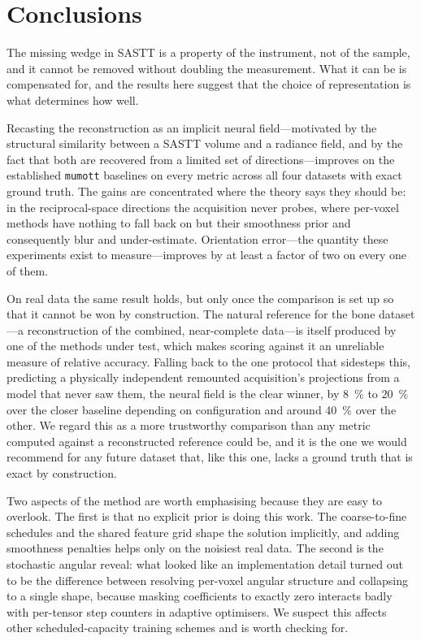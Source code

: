 \documentclass[11pt,a4paper]{article}
\begin{document}
\section{Conclusions}
\label{sec:conclusions}

The missing wedge in SASTT is a property of the instrument, not of the sample, and it
cannot be removed without doubling the measurement. What it can be is compensated for, and
the results here suggest that the choice of representation is what determines how well.

Recasting the reconstruction as an implicit neural field---motivated by the structural
similarity between a SASTT volume and a radiance field, and by the fact that both are
recovered from a limited set of directions---improves on the established \texttt{mumott}
baselines on every metric across all four datasets with exact ground truth. The gains are
concentrated where the theory says they should be: in the reciprocal-space directions the
acquisition never probes, where per-voxel methods have nothing to fall back on but their
smoothness prior and consequently blur and under-estimate. Orientation error---the quantity
these experiments exist to measure---improves by at least a factor of two on every one of
them.

On real data the same result holds, but only once the comparison is set up so that it
cannot be won by construction. The natural reference for the bone dataset---a
reconstruction of the combined, near-complete data---is itself produced by one of the
methods under test, which makes scoring against it an unreliable measure of relative
accuracy. Falling back to the one protocol that sidesteps this, predicting a physically
independent remounted acquisition's projections from a model that never saw them, the
neural field is the clear winner, by \SI{8}{\percent} to \SI{20}{\percent} over the closer
baseline depending on configuration and around \SI{40}{\percent} over the other. We regard
this as a more trustworthy comparison than any metric computed against a reconstructed
reference could be, and it is the one we would recommend for any future dataset that, like
this one, lacks a ground truth that is exact by construction.

Two aspects of the method are worth emphasising because they are easy to overlook. The
first is that no explicit prior is doing this work. The coarse-to-fine schedules and the
shared feature grid shape the solution implicitly, and adding smoothness penalties helps
only on the noisiest real data. The second is the stochastic angular reveal: what looked
like an implementation detail turned out to be the difference between resolving per-voxel
angular structure and collapsing to a single shape, because masking coefficients to exactly
zero interacts badly with per-tensor step counters in adaptive optimisers. We suspect this
affects other scheduled-capacity training schemes and is worth checking for.
\end{document}
